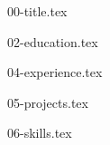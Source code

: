 \documentclass[letterpaper,11pt]{article}
\begin{document}

{00-title.tex}


{02-education.tex}


{04-experience.tex}


{05-projects.tex}


{06-skills.tex}



\vfill
{}
\end{document}
